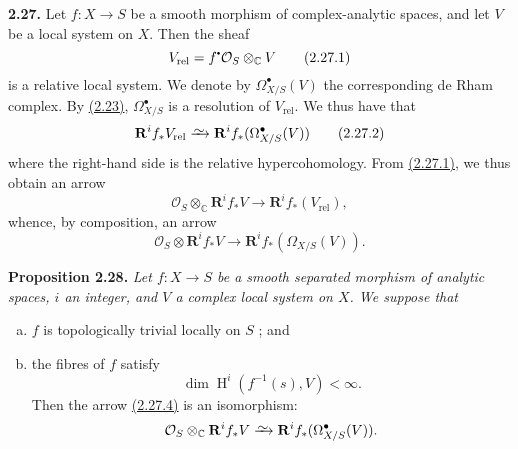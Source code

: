 \documentclass{report}
\newenvironment{itenv}[1]
  {\phantomsection\par\medskip\noindent\textbf{#1.}\itshape}
  {\medskip}
\newenvironment{rmenv}[1]
  {\phantomsection\par\medskip\noindent\textbf{#1.}\rmfamily}
  {\medskip}
\renewcommand{\cal}[1]{{\mathcal{#1}}}
\newcommand{\sbullet}{{\mathbin{\vcenter{\hbox{\scalebox{.5}{$\bullet$}}}}}}
\newcommand{\CC}{\mathbb{C}}
\newcommand{\RR}{\mathbf{R}}
\newcommand{\simto}{\xrightarrow{\raisebox{-0.7ex}[0ex][0ex]{$\sim$}}}
\DeclareMathOperator{\HH}{H}
\newcommand{\oldpage}[1]{\marginpar{\footnotesize$\Big\vert$ \textit{p.~#1}}}
\begin{document}
\begin{rmenv}{2.27}
\label{I.2.27}
  Let $f\colon X\to S$ be a smooth morphism of complex-analytic spaces, and let $V$ be a local system on $X$.
  Then the sheaf
\oldpage{20}
  \[
  \label{I.2.27.1}
    V_\mathrm{rel} = f^\sbullet\cal{O}_S \otimes_\CC V
  \tag{2.27.1}
  \]
  is a relative local system.
  We denote by $\Omega_{X/S}^\bullet(V)$ the corresponding de Rham complex.
  By \hyperref[I.2.23]{(2.23)}, $\Omega_{X/S}^\bullet$ is a resolution of $V_\mathrm{rel}$.
  We thus have that
  \[
  \label{I.2.27.2}
    \RR^i f_* V_\mathrm{rel} \simto \RR^i f_*(\Omega_{X/S}^\bullet(V))
  \tag{2.27.2}
  \]
  where the right-hand side is the relative hypercohomology.
  From \hyperref[I.2.27.1]{(2.27.1)}, we thus obtain an arrow
  \[
  \label{I.2.27.3}
    \cal{O}_S \otimes_\CC \RR^i f_*V \to \RR^i f_*(V_\mathrm{rel}),
  \tag{2.27.3}
  \]
  whence, by composition, an arrow
  \[
  \label{I.2.27.4}
    \cal{O}_S \otimes \RR^i f_*V \to \RR^i f_*(\Omega_{X/S}(V)).
  \tag{2.27.4}
  \]
\end{rmenv}

\begin{itenv}{Proposition 2.28}
\label{I.2.28}
  Let $f\colon X\to S$ be a smooth separated morphism of analytic spaces, $i$ an integer, and $V$ a complex local system on $X$.
  We suppose that
  \begin{enumerate}[a)]
    \item $f$ is topologically trivial locally on $S$ ; and
    \item the fibres of $f$ satisfy
      \[
        \dim\HH^i(f^{-1}(s),V) < \infty.
      \]
      Then the arrow \hyperref[I.2.27.4]{(2.27.4)} is an isomorphism:
      \[
        \cal{O}_S \otimes_\CC \RR^i f_*V \simto \RR^i f_*(\Omega_{X/S}^\bullet(V)).
      \]
  \end{enumerate}
\end{itenv}
\end{document}
